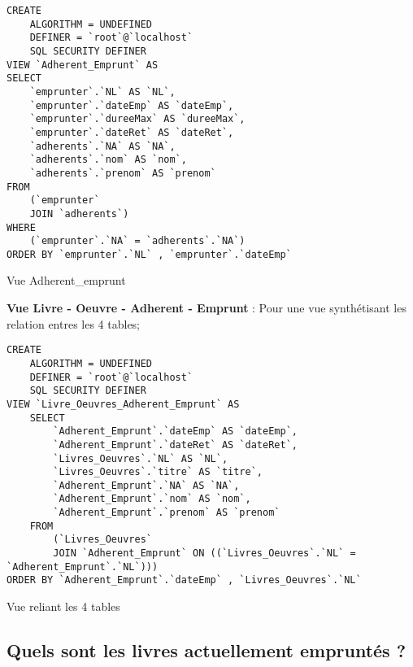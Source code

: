 \documentclass{article}
\begin{document}
\begin{listing}[H]
	\begin{verbatim}
CREATE 
    ALGORITHM = UNDEFINED 
    DEFINER = `root`@`localhost` 
    SQL SECURITY DEFINER
VIEW `Adherent_Emprunt` AS
SELECT 
    `emprunter`.`NL` AS `NL`,
    `emprunter`.`dateEmp` AS `dateEmp`,
    `emprunter`.`dureeMax` AS `dureeMax`,
    `emprunter`.`dateRet` AS `dateRet`,
    `adherents`.`NA` AS `NA`,
    `adherents`.`nom` AS `nom`,
    `adherents`.`prenom` AS `prenom`
FROM
    (`emprunter`
    JOIN `adherents`)
WHERE
    (`emprunter`.`NA` = `adherents`.`NA`)
ORDER BY `emprunter`.`NL` , `emprunter`.`dateEmp`
\end{verbatim}
	\caption{Vue Adherent\_emprunt}
\end{listing}
\textbf{Vue Livre - Oeuvre - Adherent - Emprunt }: Pour une vue synthétisant les relation entres les 4  tables;
\begin{listing}[H]
	\begin{verbatim}
CREATE 
    ALGORITHM = UNDEFINED 
    DEFINER = `root`@`localhost` 
    SQL SECURITY DEFINER
VIEW `Livre_Oeuvres_Adherent_Emprunt` AS
    SELECT 
        `Adherent_Emprunt`.`dateEmp` AS `dateEmp`,
        `Adherent_Emprunt`.`dateRet` AS `dateRet`,
        `Livres_Oeuvres`.`NL` AS `NL`,
        `Livres_Oeuvres`.`titre` AS `titre`,
		`Adherent_Emprunt`.`NA` AS `NA`,
        `Adherent_Emprunt`.`nom` AS `nom`,
        `Adherent_Emprunt`.`prenom` AS `prenom`
    FROM
        (`Livres_Oeuvres`
        JOIN `Adherent_Emprunt` ON ((`Livres_Oeuvres`.`NL` = `Adherent_Emprunt`.`NL`)))
ORDER BY `Adherent_Emprunt`.`dateEmp` , `Livres_Oeuvres`.`NL`
\end{verbatim}
	\caption{Vue reliant les 4 tables}
\end{listing}
\subsection{Quels sont les livres actuellement empruntés ?}
\end{document}
